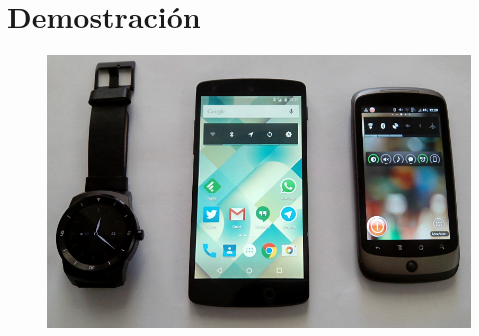 \section{Demostración}

\begin{slide}
  \begin{figure}[!h]
    \begin{center}
      \includegraphics[height=0.6\textheight]{img/hardware.png}
    \end{center}
  \end{figure}
\end{slide}

